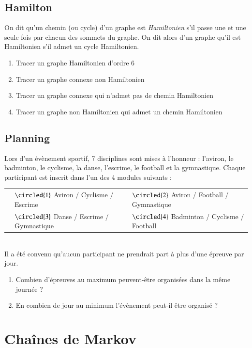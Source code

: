 \documentclass[oneside,12pt]{article}          %
\begin{document}
\subsection{Hamilton}
On dit qu'un chemin (ou cycle) d'un graphe est \textit{Hamiltonien} s'il passe une et une seule fois par chacun des sommets du graphe. On dit alors d'un graphe qu'il est Hamiltonien s'il admet un cycle Hamiltonien.
\begin{enumerate}
    \item Tracer un graphe Hamiltonien d'ordre 6
    \item Tracer un graphe connexe non Hamiltonien
    \item Tracer un graphe connexe qui n'admet pas de chemin Hamiltonien
    \item Tracer un graphe non Hamiltonien qui admet un chemin Hamiltonien
\end{enumerate}



\subsection{Planning}
Lors d'un évènement sportif, 7 disciplines sont mises à l'honneur : l'aviron, le badminton, le cyclisme, la danse, l'escrime, le football et la gymnastique. Chaque participant est inscrit dans l'un des 4 modules suivants : \\[10pt]
\begin{tabular}{p{}p{} p{}}
     & $\circled{1}$ Aviron / Cyclisme / Escrime & $\circled{2}$ Aviron / Football / Gymnastique \\[3pt]
     & $\circled{3}$ Danse / Escrime / Gymnastique & $\circled{4}$ Badminton / Cyclisme / Football
\end{tabular} \\[5pt]

Il a été convenu qu'aucun participant ne prendrait part à plus d'une épreuve par jour.
\begin{enumerate}
    \item Combien d'épreuves au maximum peuvent-être organisées dans la même journée ?
    \item En combien de jour au minimum l'évènement peut-il être organisé ?
\end{enumerate}




\section{Chaînes de Markov}
\end{document}

